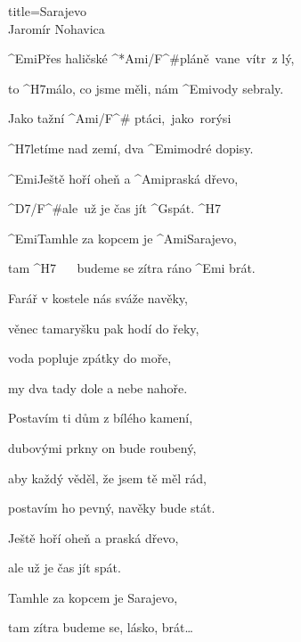 \begin{song}{title=\predtitle\centering Sarajevo \\\large Jaromír Nohavica \vspace*{-0.3cm}}  %
\begin{centerjustified}
\nejvetsi

\sloka 
	^{Emi}Přes haličské ^*{Ami/F^{\#}}pláně~vane~vítr~z lý,
	
	to ^{H7\z}málo, co jsme měli, nám ^{Emi\z}vody sebraly.
	
	Jako tažní ^{Ami/F^{\#} }ptáci,~jako~rorýsi
	
	^{H7\z}letíme nad zemí, dva ^{Emi\z}modré dopisy.

	^{Emi\z}Ještě hoří oheň a ^{Ami\z}praská dřevo,
	
	^{D7/F^{\#}\z}ale~už je čas jít ^{G\z}spát. ^{H7}

	^{Emi\z}Tamhle za kopcem je ^{Ami\z}Sarajevo,
	
	tam ^{H7\,\,\,\,\,\,\,\,\,\,}budeme se zítra ráno ^{Emi\,\,}brát.

\sloka
	Farář v kostele nás sváže navěky,
	
	věnec tamaryšku pak hodí do řeky,
	
	voda popluje zpátky do moře,
	
	my dva tady dole a nebe nahoře.


\sloka
	Postavím ti dům z bílého kamení,
	
	dubovými prkny on bude roubený,

	aby každý věděl, že jsem tě měl rád,
	
	postavím ho pevný, navěky bude stát.

	Ještě hoří oheň a praská dřevo,
	
	ale už je čas jít spát.
	
	Tamhle za kopcem je Sarajevo,
	
	tam zítra budeme se, lásko, brát\elipsa\dots

\end{centerjustified}
\setcounter{Slokočet}{0}
\end{song}
